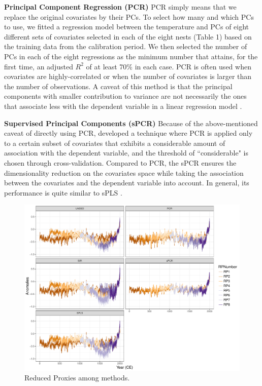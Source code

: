 \documentclass[12pt]{amsart}
\theoremstyle{plain}
\theoremstyle{definition}
\theoremstyle{remark}
\begin{document}
{\bf Principal Component Regression (PCR)}
PCR simply means that we replace the original covariates by their PCs. To select how many and which PCs to use, we fitted a regression model between the temperature and PCs of eight different sets of covariates selected in each of the eight nests (Table 1) based on the training data from the calibration period. We then selected the number of PCs in each of
the eight regressions as the minimum number that attains, for the first time, an adjusted
$R^2$ of at least 70\% in each case. PCR is often used when covariates are
highly-correlated or when the number of covariates is larger than the number of 
 observations. A caveat of this method is that the principal components
with smaller contribution to variance are not necessarily the ones that
associate less with the dependent variable in a linear regression model 
\citep{Jolliffe1982,Tibshirani1996}. 

{\bf Supervised Principal Components (sPCR)}
Because of the above-mentioned caveat of directly using PCR, \cite{Bair2006} developed a technique where PCR is applied only
to a certain subset of covariates that exhibits a considerable amount of association
 with the dependent variable, and the threshold of ``considerable" is chosen through
cross-validation. Compared to PCR, the sPCR ensures the dimensionality
reduction on the covariates space while taking the association between
the covariates and the dependent variable into account. In general, its performance is quite similar to sPLS  \citep{Chung2013}.  

\begin{figure}[h!]
  \centering
 \includegraphics[scale=0.40]{RPs_type} 
  \caption{Reduced Proxies among methods.}
  \label{fig:RPs}
\end{figure}
\end{document}
